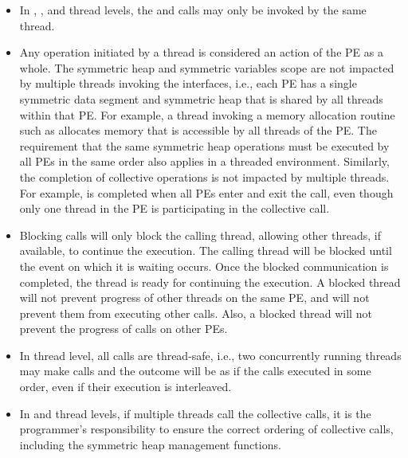 \begin{itemize}
\item
In , , and  thread
levels, the  and  calls may only be invoked by the same thread.

\item
Any \openshmem{} operation initiated by a thread is considered an action of the \ac{PE} as a whole.
The symmetric heap and symmetric variables scope
are not impacted by multiple threads invoking the
\openshmem{} interfaces, i.e., 
each \ac{PE} has a single symmetric data segment and symmetric heap that is shared by
all threads within that \ac{PE}.  For example, a thread invoking a memory allocation
routine such as  
allocates memory that is accessible by all threads of the \ac{PE}. 
The requirement that the same symmetric heap operations must
be executed by all \acp{PE} in the same order also applies in a threaded
environment. Similarly, the completion of collective operations is not impacted by multiple threads. 
For example,  is completed when all \acp{PE} enter and
exit the  call, even though only one thread in the \ac{PE} is
participating in the collective call. 


\item Blocking \openshmem{} calls will only block the calling thread, allowing
other threads, if available, to continue the execution. The calling thread will be blocked until the
event on which it is waiting occurs. Once the blocked communication is
completed, the thread is ready for continuing the execution. A blocked thread
will not prevent progress of other threads on the same \ac{PE}, and will not
prevent them from executing other \openshmem{} calls. Also, a blocked thread
will not prevent the progress of \openshmem{} calls on other \acp{PE}. 

\item In  thread level, all \openshmem{} calls are thread-safe, 
i.e., two concurrently running threads may make \openshmem{} calls and the outcome will be as if the calls executed in
some order, even if their execution is interleaved.

\item In  and  thread levels, 
if multiple threads call the collective calls, it is the programmer's responsibility to ensure the correct ordering of
collective calls, including the symmetric heap management functions.

\end{itemize} 
